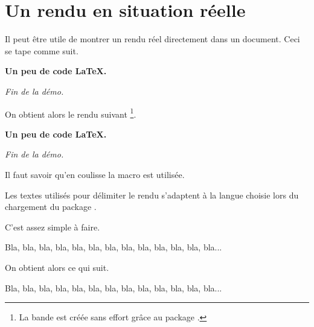 \documentclass[12pt,a4paper]{article}
\begin{document}
\section{Un rendu en situation réelle}


Il peut être utile de montrer un rendu réel directement dans un document. Ceci se tape comme suit.

\begin{doclatex-alone}
\begin{docshowcase}
    \bfseries Un peu de code \LaTeX.

    \bigskip

    \itshape Fin de la démo.
\end{docshowcase}
\end{doclatex-alone}

On obtient alors le rendu suivant
\footnote{
    La bande est créée sans effort grâce au package .
}.

\medskip

\begin{docshowcase}
    \bfseries Un peu de code \LaTeX.

    \bigskip

    \itshape Fin de la démo.
\end{docshowcase}


\bigskip


Il faut savoir qu'en coulisse la macro  est utilisée.

\begin{doclatex-flat}
\end{doclatex-flat}


\begin{docrem}
    Les textes utilisés pour délimiter le rendu s'adaptent à la langue choisie lors du chargement du package .
\end{docrem}




C'est assez simple à faire.

\begin{doclatex-alone}
\begin{docshowcase}[Mon début]%
                   [Ma fin]
    Bla, bla, bla, bla, bla, bla, bla, bla, bla, bla, bla, bla, bla...
\end{docshowcase}
\end{doclatex-alone}

On obtient alors ce qui suit.

\medskip

\begin{docshowcase}[Mon début]%
                   [Ma fin]
    Bla, bla, bla, bla, bla, bla, bla, bla, bla, bla, bla, bla, bla...
\end{docshowcase}
\end{document}
